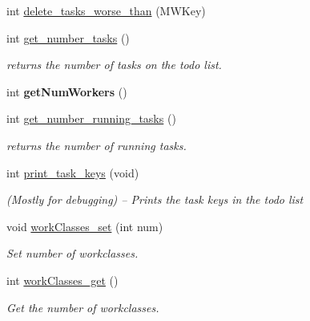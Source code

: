 \begin{DoxyCompactItemize}
int \hyperlink{classMWDriver_ae4c5921926e8780642d1b7dacf1a7016}{delete\+\_\+tasks\+\_\+worse\+\_\+than} (M\+W\+Key)
\item 
\mbox{\label{classMWDriver_a91e7f38f78eba72bd69103a25730f9a9}} 
int \hyperlink{classMWDriver_a91e7f38f78eba72bd69103a25730f9a9}{get\+\_\+number\+\_\+tasks} ()
\begin{DoxyCompactList}\small\item\em returns the number of tasks on the todo list. \end{DoxyCompactList}\item 
\mbox{\label{classMWDriver_a54e42db5bff6f63d6a0dc4886a293a2e}} 
int {\bfseries get\+Num\+Workers} ()
\item 
\mbox{\label{classMWDriver_a71ca10beb1bce49579a44a657ed1f7a8}} 
int \hyperlink{classMWDriver_a71ca10beb1bce49579a44a657ed1f7a8}{get\+\_\+number\+\_\+running\+\_\+tasks} ()
\begin{DoxyCompactList}\small\item\em returns the number of running tasks. \end{DoxyCompactList}\item 
\mbox{\label{classMWDriver_a8d2aea2804ff2f999ea206a3ee0f096a}} 
int \hyperlink{classMWDriver_a8d2aea2804ff2f999ea206a3ee0f096a}{print\+\_\+task\+\_\+keys} (void)
\begin{DoxyCompactList}\small\item\em (Mostly for debugging) -- Prints the task keys in the todo list \end{DoxyCompactList}\item 
\mbox{\label{classMWDriver_a49177e47b2d394aff1bc952e98bb7e19}} 
void \hyperlink{classMWDriver_a49177e47b2d394aff1bc952e98bb7e19}{work\+Classes\+\_\+set} (int num)
\begin{DoxyCompactList}\small\item\em Set number of workclasses. \end{DoxyCompactList}\item 
\mbox{\label{classMWDriver_af239d1566ec6f0657891a027399d1217}} 
int \hyperlink{classMWDriver_af239d1566ec6f0657891a027399d1217}{work\+Classes\+\_\+get} ()
\begin{DoxyCompactList}\small\item\em Get the number of workclasses. \end{DoxyCompactList}\item 

\end{DoxyCompactItemize}

